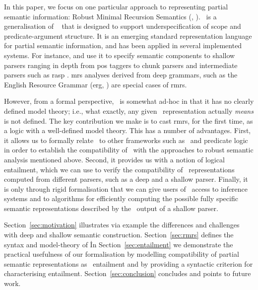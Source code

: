 In this paper, we focus on one particular approach to representing
partial semantic information: Robust Minimal Recursion Semantics
(\rmrs, \cite{copestake:2003}).  \rmrs\ is a generalisation of \mrs\
\cite{copestake:etal:2005} that is designed to support
underspecification of scope and predicate-argument structure.  It is
an emerging standard representation language for partial semantic
information, and has been applied in several implemented systems.  For
instance, \newcite{copestake:2003} and \newcite{frank:2004} use it to
specify semantic components to shallow parsers ranging in depth from
{\sc pos} taggers to chunk parsers and intermediate parsers such as
{\sc rasp} \cite{briscoe:etal:2006}.  {\sc mrs} analyses derived from
deep grammars, such as the English Resource Grammar ({\sc erg},
\cite{copestake:flickinger:2000}) are special cases of {\sc
  rmrs}.

However, from a formal perspective, \rmrs\ is somewhat ad-hoc in that
it has no clearly defined model theory; i.e., what exactly, any given
\rmrs\ representation actually \emph{means} is not defined.  The key
contribution we make is to cast {\sc rmrs}, for the first time, as a
logic with a well-defined model theory.  This has a number of
advantages.  First, it allows us to formally relate \rmrs\ to other
frameworks such as \mrs\ and predicate logic in order to establish the
compatibility of \rmrs\ with the approaches to robust semantic
analysis mentioned above.  
Second, it provides us with a notion of logical
entailment, which we can use to verify the compatibility of \rmrs\ 
representations computed from different parsers, such as a deep and a
shallow parser.  Finally, it is only through rigid formalisation that
we can give users of \rmrs\ access to inference systems and to
algorithms for efficiently computing the possible fully specific
semantic representations described by the \rmrs\ output of a shallow
parser.

Section~\ref{sec:motivation} illustrates via example the differences
and challenges with deep and shallow semantic construction.
Section~\ref{sec:rmrs} defines the syntax and model-theory of \rmrs\.
In Section~\ref{sec:entailment} we demonstrate the practical
usefulness of our formalisation by modelling compatibility of partial
semantic representations as \rmrs\ entailment and by providing a
syntactic criterion for characterising entailment.
Section~\ref{sec:conclusion} concludes and points to future work.


